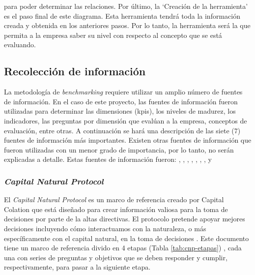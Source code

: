para poder determinar las relaciones. Por último, la ‘Creación de la herramienta’ es el paso final de este diagrama. Esta herramienta tendrá toda la información creada y obtenida en los anteriores pasos. Por lo tanto, la herramienta será la que permita a la empresa saber su nivel con respecto al concepto que se está evaluando. 


\subsection{Recolección de información} \label{subsec:recoleccion-informacion}
La metodología de \textit{benchmarking} requiere utilizar un amplio número de fuentes de información. En el caso de este proyecto, las fuentes de información fueron utilizadas para determinar las dimensiones (\acrshort{kpis}), los niveles de madurez, los indicadores, las preguntas por dimensión que evalúan a la empresa, conceptos de evaluación, entre otras. A continuación se hará una descripción de las siete (7) fuentes de información más importantes. Existen otras fuentes de información que fueron utilizadas con un menor grado de importancia, por lo tanto, no serán explicadas a detalle. Estas fuentes de información fueron: \parencite{alliance-for-water-stewardship-2019}, \parencite{gri-2022}, \parencite{iso-1999}, \parencite{pacific-institute-2014}, \parencite{world-business-council-for-sustainable-development-2011}, \parencite{world-resources-institute-2008}, \parencite{world-wildlife-fund-2021}, \parencite{taskforce-on-nature-related-financial-disclosures-2023} y \parencite{climate-disclosure-standards-board-2022}

\subsubsection{\textit{Capital Natural Protocol}}
El \textit{Capital Natural Protocol} es un marco de referencia creado por Capital Colation que está diseñado para crear información valiosa para la toma de decisiones por parte de la altas directivas. El protocolo pretende apoyar mejores decisiones incluyendo cómo interactuamos con la naturaleza, o más específicamente con el capital natural, en la toma de decisiones \textit{\parencite{capitals-coalition-2021}}. Este documento tiene un marco de referencia divido en 4 etapas (Tabla \ref{tab:cnp-etapas}) , cada una con series de preguntas y objetivos que se deben responder y cumplir, respectivamente, para pasar a la siguiente etapa. 


